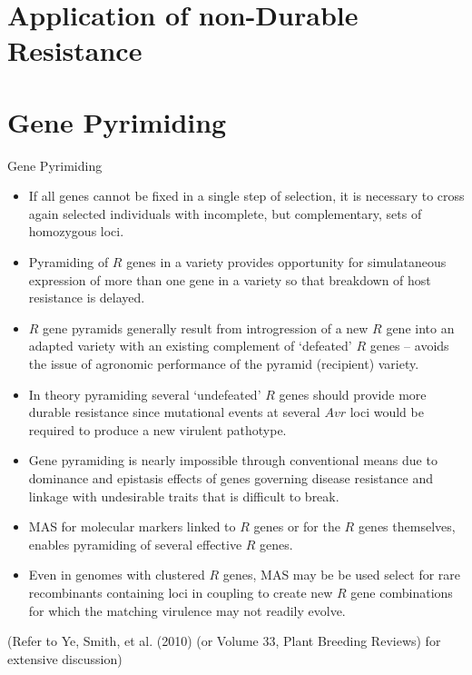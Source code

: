 \documentclass[11pt,dvipsnames,ignorenonframetext,aspectratio=169]{beamer}
\providecommand{\tightlist}{%
  \setlength{\itemsep}{0pt}\setlength{\parskip}{0pt}}
\begin{document}
\hypertarget{application-of-non-durable-resistance}{%
\section{Application of non-Durable
Resistance}\label{application-of-non-durable-resistance}}

\hypertarget{gene-pyrimiding}{%
\section{Gene Pyrimiding}\label{gene-pyrimiding}}

\begin{frame}{Gene Pyrimiding}
\small

\begin{itemize}
\tightlist
\item
  If all genes cannot be fixed in a single step of selection, it is
  necessary to cross again selected individuals with incomplete, but
  complementary, sets of homozygous loci.
\item
  Pyramiding of \(R\) genes in a variety provides opportunity for
  simulataneous expression of more than one gene in a variety so that
  breakdown of host resistance is delayed.
\item
  \(R\) gene pyramids generally result from introgression of a new \(R\)
  gene into an adapted variety with an existing complement of `defeated'
  \(R\) genes -- avoids the issue of agronomic performance of the
  pyramid (recipient) variety.
\item
  In theory pyramiding several `undefeated' \(R\) genes should provide
  more durable resistance since mutational events at several \(Avr\)
  loci would be required to produce a new virulent pathotype.
\end{itemize}
\end{frame}

\begin{frame}{}
\protect\hypertarget{section-5}{}
\small

\begin{itemize}
\tightlist
\item
  Gene pyramiding is nearly impossible through conventional means due to
  dominance and epistasis effects of genes governing disease resistance
  and linkage with undesirable traits that is difficult to break.
\item
  MAS for molecular markers linked to \(R\) genes or for the \(R\) genes
  themselves, enables pyramiding of several effective \(R\) genes.
\item
  Even in genomes with clustered \(R\) genes, MAS may be be used select
  for rare recombinants containing loci in coupling to create new \(R\)
  gene combinations for which the matching virulence may not readily
  evolve.
\end{itemize}

(\footnotesize Refer to Ye, Smith, et al. (2010) (or Volume 33, Plant
Breeding Reviews) for extensive discussion)
\end{frame}
\end{document}
